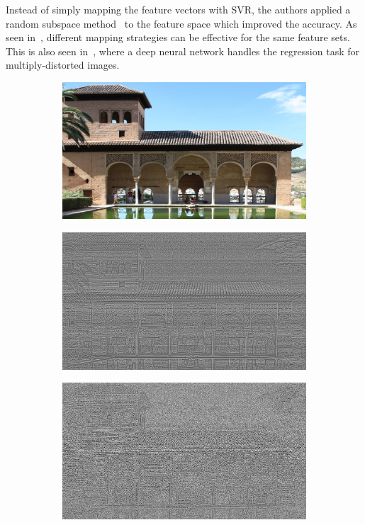 Instead of simply mapping the feature vectors with SVR, the authors applied a random subspace method~\cite{Ho1998} to the feature space which improved the accuracy. As seen in~\cite{Ma2017forest}, different mapping strategies can be effective for the same feature sets. This is also seen in~\cite{Zhou2019}, where a deep neural network handles the regression task for multiply-distorted images. 
\begin{figure}
     \centering
     \begin{subfigure}[b]{0.3\textwidth}
         \centering
         \includegraphics[width=\textwidth]{./figs/org009}
         \caption{}
         \label{fig:gcslbp-orig}
     \end{subfigure}
     \hfill
     \begin{subfigure}[b]{0.3\textwidth}
         \centering
         \includegraphics[width=\textwidth]{./figs/MSCN_house}
         \caption{}
         \label{fig:gcslbp-mscn}
     \end{subfigure}
     \hfill
     \begin{subfigure}[b]{0.3\textwidth}
         \centering
         \includegraphics[width= \textwidth]{./figs/lbp_mscn}

\end{subfigure}
\end{figure}
